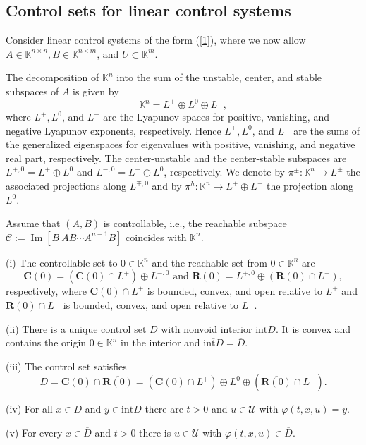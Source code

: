 \documentclass{siamltex}%
\begin{document}
\subsection{Control sets for linear control systems\label{Subsection2.3}}

Consider linear control systems of the form (\ref{1}), where we now allow
$A\in\mathbb{K}^{n\times n},B\in\mathbb{K}^{n\times m}$, and $U\subset
\mathbb{K}^{m}$.

The decomposition of $\mathbb{K}^{n}$ into the sum of the unstable, center,
and stable subspaces of $A$ is given by%
\begin{equation}
\mathbb{K}^{n}=L^{+}\oplus L^{0}\oplus L^{-}, \label{decomposition1}%
\end{equation}
where $L^{+},L^{0}$, and $L^{-}$ are the Lyapunov spaces for positive,
vanishing, and negative Lyapunov exponents, respectively. Hence $L^{+},L^{0}$,
and $L^{-}$ are the sums of the generalized eigenspaces for eigenvalues with
positive, vanishing, and negative real part, respectively. The center-unstable
and the center-stable subspaces are $L^{+,0}=L^{+}\oplus L^{0}$ and
$L^{-,0}=L^{-}\oplus L^{0}$, respectively. We denote by $\pi^{\pm}%
:\mathbb{K}^{n}\rightarrow L^{\pm}$ the associated projections along
$L^{\mp,0}$ and by $\pi^{h}:\mathbb{K}^{n}\rightarrow L^{+}\oplus L^{-}$ the
projection along $L^{0}$.

\begin{theorem}
\label{Theorem_cs}Assume that $(A,B)$ is controllable, i.e., the reachable
subspace $\mathcal{C}:=\operatorname{Im}[B~AB\cdots A^{n-1}B]$ coincides with
$\mathbb{K}^{n}$.

(i) The controllable set to $0\in\mathbb{K}^{n}$ and the reachable set from
$0\in\mathbb{K}^{n}$ are
\[
\mathbf{C}(0)=(\mathbf{C}(0)\cap L^{+})\oplus L^{-,0}\text{ and }%
\mathbf{R}(0)=L^{+,0}\oplus(\mathbf{R}(0)\cap L^{-}),
\]
respectively, where $\mathbf{C}(0)\cap L^{+}$ is bounded, convex, and open
relative to $L^{+}$ and $\mathbf{R}(0)\cap L^{-}$ is bounded, convex, and open
relative to $L^{-}$.

(ii) There is a unique control set $D$ with nonvoid interior $\mathrm{int}D$.
It is convex and contains the origin $0\in\mathbb{K}^{n}$ in the interior and
$\overline{\mathrm{int}D}=\overline{D}$.

(iii) The control set satisfies%
\[
D=\mathbf{C}(0)\cap\overline{\mathbf{R}(0)}=\left(  \mathbf{C}(0)\cap
L^{+}\right)  \oplus L^{0}\oplus(\overline{\mathbf{R}(0)}\cap L^{-}).
\]


(iv) For all $x\in D$ and $y\in\mathrm{int}D$ there are $t>0$ and
$u\in\mathcal{U}$ with $\varphi(t,x,u)=y$.

(v) For every $x\in\overline{D}$ and $t>0$ there is $u\in\mathcal{U}$ with
$\varphi(t,x,u)\in\overline{D}$.
\end{theorem}
\end{document}

